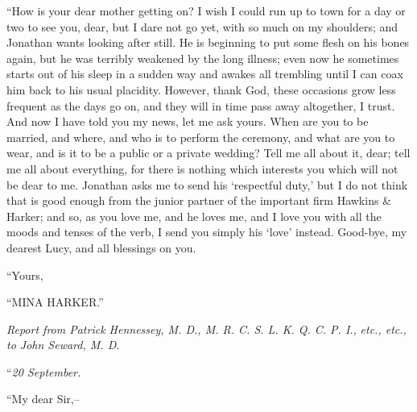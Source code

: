 \documentclass[12pt,openright]{book}
\begin{document}
“How is your dear mother getting on? I wish I could run up to town for a day or two to see you, dear, but I dare not go yet, with so much on my shoulders; and Jonathan wants looking after still. He is beginning to put some flesh on his bones again, but he was terribly weakened by the long illness; even now he sometimes starts out of his sleep in a sudden way and awakes all trembling until I can coax him back to his usual placidity. However, thank God, these occasions grow less frequent as the days go on, and they will in time pass away altogether, I trust. And now I have told you my news, let me ask yours. When are you to be married, and where, and who is to perform the ceremony, and what are you to wear, and is it to be a public or a private wedding? Tell me all about it, dear; tell me all about everything, for there is nothing which interests you which will not be dear to me. Jonathan asks me to send his ‘respectful duty,’ but I do not think that is good enough from the junior partner of the important firm Hawkins \& Harker; and so, as you love me, and he loves me, and I love you with all the moods and tenses of the verb, I send you simply his ‘love’ instead. Good-bye, my dearest Lucy, and all blessings on you.

“Yours,

“MINA HARKER.”

\textit{Report from Patrick Hennessey, M. D., M. R. C. S. L. K. Q. C. P. I.,}\textit{ }\textit{etc., etc., to John Seward, M. D.}

“\textit{20 September.}

“My dear Sir,–
\end{document}

